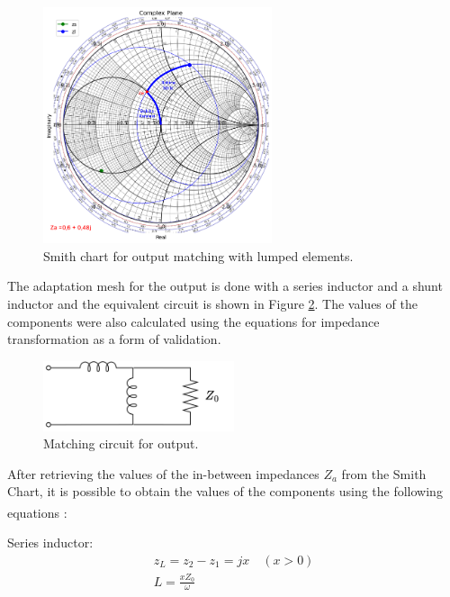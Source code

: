 \begin{figure}[H]
    \centering
    \includegraphics[width=0.6\textwidth]{Images/zl-lc-match.png}
    \caption{Smith chart for output matching with lumped elements.}
    \label{fig:zl-LC-matching}
\end{figure}

The adaptation mesh for the output is done with a series inductor and a shunt inductor and the equivalent circuit is shown in Figure \ref{fig:MatchingCircuit-output}. The values of the components were also calculated using the equations for impedance transformation as a form of validation.

\begin{figure}[H]
    \centering
    \includegraphics[width=0.5\textwidth]{Images/Ouput-matching-circuit.png}
    \caption{Matching circuit for output.}
    \label{fig:MatchingCircuit-output} 
\end{figure}

After retrieving the values of the in-between impedances $Z_a$ from the Smith Chart, it is possible to obtain the values of the components using the following equations \textsuperscript{\cite{Pozar}}:

\vspace{0.4cm}
Series inductor:
\begin{equation}
    \begin{split}
        z_L = z_2 -  z_1 = jx \quad(x > 0)\\
        L = \frac{xZ_0}{\omega}
    \end{split}
    \label{eq:SeriesInductor}
\end{equation}


